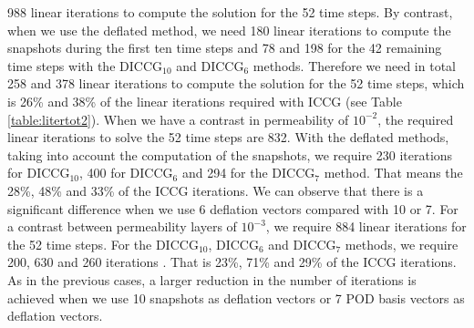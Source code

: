 \documentclass[12pt]{article}
\begin{document}
988 linear iterations to compute the solution for the 52 time steps. By contrast, when we use the deflated method,
we need 180 linear iterations to compute the snapshots during the first ten time steps and 78 and 198 for the 42
remaining time steps with the DICCG$_{10}$ and DICCG$_6$ methods. Therefore we need in total 258 and 378 linear
iterations to compute the solution for the 52 time steps, which is 26\% and 38\% of the linear iterations required
with ICCG (see Table \ref{table:litertot2}).
When we have a contrast in permeability of $10^{-2}$, the required linear iterations to solve the 52 time steps
are 832. With the deflated methods, taking into account the computation of the snapshots, we require 230  iterations
for DICCG$_{10}$, 400 for DICCG$_6$ and 294 for the DICCG$_7$ method. That means the 28\%, 48\% and 33\% of the
ICCG iterations. We can observe that there is a significant difference when we use 6 deflation vectors compared
with 10 or 7. 
For a contrast between permeability layers of $10^{-3}$, we require 884 linear iterations for the 52 time steps.
For the DICCG$_{10}$, DICCG$_6$ and DICCG$_7$ methods, we require 200, 630 and 260 iterations . That is 23\%, 71\%
and 29\% of the ICCG iterations. As in the previous cases, a larger reduction in the number of iterations is 
achieved when we use 10 snapshots as deflation vectors or 7 POD basis vectors as deflation vectors.
\end{document}

